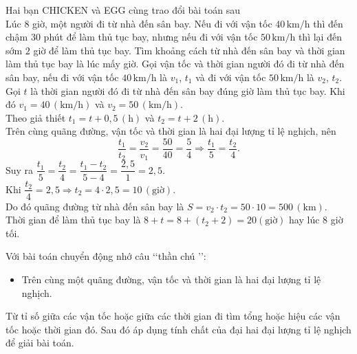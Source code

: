 \begin{bt}%
Hai bạn CHICKEN và EGG cùng  trao đổi bài toán sau\\
Lúc $8$ giờ, một người đi từ nhà đến sân bay. Nếu đi với vận tốc $40\, \mathrm{km}/\mathrm{h}$ thì đến chậm $30$ phút để làm thủ tục bay, nhưng nếu đi với vận tốc $50\, \mathrm{km}/\mathrm{h}$ thì lại đến sớm  $2$ giờ để làm thủ tục bay. Tìm khoảng cách từ nhà đến sân bay và thời gian làm thủ tục bay là lúc mấy giờ.
	\loigiai
	{Gọi vận tốc và thời gian người đó đi từ nhà đến sân bay, nếu đi với vận tốc $40\, \mathrm{km}/\mathrm{h}$ là $v_{1}$, $t_{1}$ và đi với vận tốc $50\, \mathrm{km}/\mathrm{h}$ là $v_{2}$, $t_{2}$. Gọi $t$  là thời gian người đó đi từ nhà đến sân bay đúng giờ làm thủ tục bay.
	Khi đó $v_{1} = 40\,\left(\mathrm{km}/\mathrm{h}\right)$  và $v_{2}= 50\, \left(\mathrm{km}/\mathrm{h}\right)$.\\
	Theo giả thiết $t_{1}  = t + 0{,}5\, \left(\mathrm{h}\right)$ và $t_{2} = t + 2\, \left(\mathrm{h}\right)$.\\
	Trên cùng quãng đường, vận tốc và thời gian là hai đại lượng tỉ lệ nghịch, nên 
		$$\dfrac{t_{1}}{t_{2}} =  \dfrac{v_{2}}{v_{1}}  = \dfrac{50}{40} = \dfrac{5}{4}\Rightarrow \dfrac{t_{1}}{5} = \dfrac{t_{2}}{4}.$$  
		Suy ra 	$\dfrac{t_{1}}{5} = \dfrac{t_{2}}{4} = \dfrac{t_{1} -  t_{2}}{5 - 4} = \dfrac{2{,}5}{1} = 2{,}5$.\\
		Khi $\dfrac{t_{2}}{4} = 2{,}5 \Rightarrow t_{2} = 4\cdot 2{,}5 = 10\, \left(\text{giờ}\right)$.\\
		Do đó quãng đường từ nhà đến sân bay là $S = v_{2}\cdot t_{2} = 50\cdot 10 = 500\, \left(\mathrm{km}\right)$.\\
		Thời gian để làm thủ tục bay là $8 + t = 8 + \left(t_{2} + 2\right) = 20\left(\text{giờ}\right)$ hay lúc $8$ giờ tối.
	}		
\end{bt}
\begin{note} 
Với bài toán chuyển động nhớ câu  \lq\lq thần chú \rq\rq :
	\begin{itemize}
		\item Trên cùng một quãng đường, vận tốc và thời gian là hai đại lượng tỉ lệ nghịch.
	\end{itemize}
Từ tỉ số giữa các vận tốc hoặc giữa các thời gian đi tìm tổng hoặc hiệu các vận tốc hoặc thời gian đó. Sau đó áp dụng tính chất của đại hai đại lượng tỉ lệ nghịch để giải bài toán.
\end{note}
